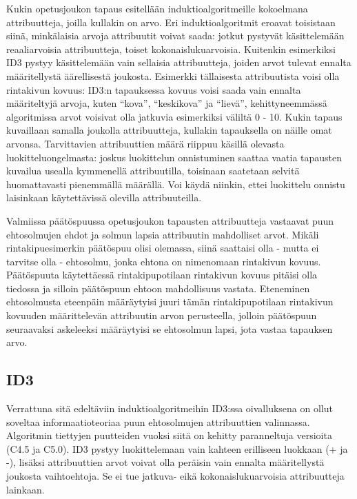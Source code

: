 \documentclass[12pt,finnish]{tktltiki2}
\theoremstyle{definition}
\theoremstyle{remark}
\begin{document}
Kukin opetusjoukon tapaus esitellään induktioalgoritmeille kokoelmana attribuutteja, joilla kullakin on arvo.
Eri induktioalgoritmit eroavat toisistaan siinä, minkälaisia arvoja attribuutit voivat saada:
jotkut pystyvät käsittelemään reaaliarvoisia attribuutteja, toiset kokonaislukuarvoisia. Kuitenkin esimerkiksi
ID3 pystyy käsittelemään vain sellaisia attribuutteja, joiden arvot tulevat ennalta määritellystä
äärellisestä joukosta. Esimerkki tällaisesta attribuutista voisi olla rintakivun kovuus: ID3:n tapauksessa kovuus voisi
saada vain ennalta määriteltyjä arvoja, kuten ``kova'', ``keskikova'' ja ``lievä'', kehittyneemmässä
algoritmissa arvot voisivat olla jatkuvia esimerkiksi väliltä 0 - 10. Kukin tapaus kuvaillaan
samalla joukolla attribuutteja, kullakin tapauksella on näille omat arvonsa. Tarvittavien attribuuttien määrä
riippuu käsillä olevasta luokitteluongelmasta: joskus luokittelun onnistuminen saattaa vaatia
tapausten kuvailua usealla kymmenellä attribuutilla, toisinaan saatetaan selvitä huomattavasti pienemmällä
määrällä. Voi käydä niinkin, ettei luokittelu onnistu laisinkaan käytettävissä olevilla attribuuteilla.

Valmiissa päätöspuussa opetusjoukon tapausten attribuutteja vastaavat puun ehtosolmujen ehdot ja solmun lapsia
attribuutin mahdolliset arvot. Mikäli rintakipuesimerkin päätöspuu olisi olemassa, siinä saattaisi olla - mutta
ei tarvitse olla - ehtosolmu, jonka ehtona on nimenomaan rintakivun kovuus. Päätöspuuta käytettäessä
rintakipupotilaan rintakivun kovuus pitäisi olla tiedossa ja silloin päätöspuun ehtoon mahdollisuus vastata.
Eteneminen ehtosolmusta eteenpäin määräytyisi juuri tämän rintakipupotilaan rintakivun kovuuden määrittelevän
attribuutin arvon perusteella, jolloin päätöspuun seuraavaksi askeleeksi määräytyisi se ehtosolmun lapsi,
jota vastaa tapauksen arvo. 

\subsection{ID3}
\label{sec:ID3}
Verrattuna sitä edeltäviin induktioalgoritmeihin ID3:ssa oivalluksena on ollut soveltaa informaatioteoriaa
puun ehtosolmujen attribuuttien valinnassa. Algoritmin tiettyjen puutteiden vuoksi siitä on kehitty
paranneltuja versioita (C4.5 ja C5.0). ID3 pystyy luokittelemaan vain kahteen erilliseen luokkaan (+ ja -), lisäksi
attribuuttien arvot voivat olla peräisin vain ennalta määritellystä joukosta vaihtoehtoja. Se ei tue
jatkuva- eikä kokonaislukuarvoisia attribuutteja lainkaan.
\end{document}
